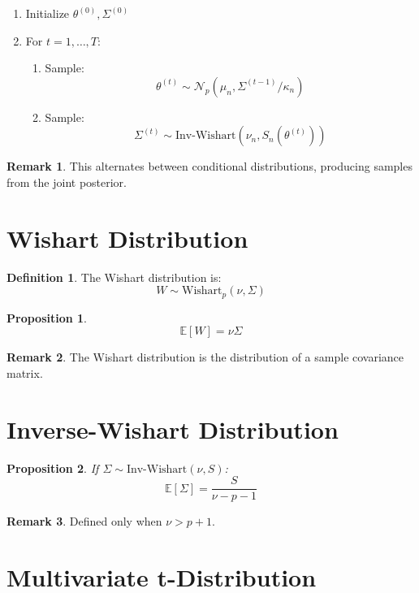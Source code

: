 \documentclass[12pt,oneside]{book}
\numberwithin{equation}{section}
\theoremstyle{definition}
\newtheorem{definition}{Definition}[section]
\newtheorem{remark}{Remark}[section]
\theoremstyle{plain}
\newtheorem{proposition}{Proposition}[section]
\theoremstyle{remark}
\newcommand{\E}{\mathbb{E}}
\newcommand{\Normal}{\mathcal{N}}
\begin{document}
\begin{algorithm}
\begin{enumerate}
\item Initialize $\theta^{(0)}, \Sigma^{(0)}$
\item For $t=1,\dots,T$:
\begin{enumerate}
\item Sample:
$$
\theta^{(t)} \sim \Normal_p(\mu_n, \Sigma^{(t-1)} / \kappa_n)
$$
\item Sample:
$$
\Sigma^{(t)} \sim \text{Inv-Wishart}(\nu_n, S_n(\theta^{(t)}))
$$
\end{enumerate}
\end{enumerate}
\end{algorithm}

\begin{remark}
This alternates between conditional distributions, producing samples from the joint posterior.
\end{remark}

\section{Wishart Distribution}

\begin{definition}
The Wishart distribution is:
$$
W \sim \text{Wishart}_p(\nu, \Sigma)
$$
\end{definition}

\begin{proposition}
$$
\E[W] = \nu \Sigma
$$
\end{proposition}

\begin{remark}
The Wishart distribution is the distribution of a sample covariance matrix.
\end{remark}

\section{Inverse-Wishart Distribution}

\begin{proposition}
If $\Sigma \sim \text{Inv-Wishart}(\nu, S)$:
$$
\E[\Sigma] = \frac{S}{\nu - p - 1}
$$
\end{proposition}

\begin{remark}
Defined only when $\nu > p + 1$.
\end{remark}

\section{Multivariate t-Distribution}
\end{document}
